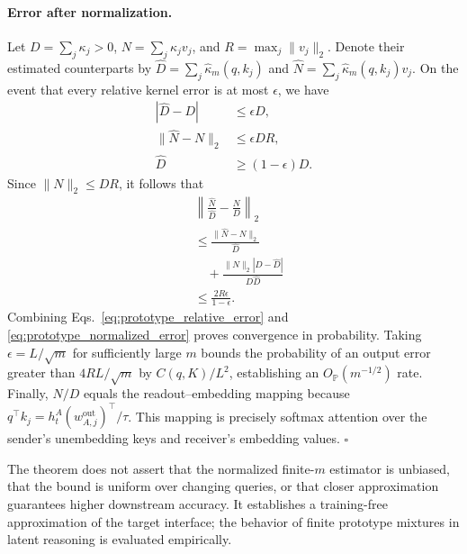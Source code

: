 \documentclass[11pt]{article}
\begin{document}
\paragraph{Error after normalization.}
Let $D=\sum_j\kappa_j>0$, $N=\sum_j\kappa_jv_j$, and $R=\max_j\|v_j\|_2$. Denote their estimated counterparts by $\widehat D=\sum_j\widehat{\kappa}_m(q,k_j)$ and $\widehat N=\sum_j\widehat{\kappa}_m(q,k_j)v_j$. On the event that every relative kernel error is at most $\epsilon$, we have
\[
\begin{aligned}
    |\widehat D-D|&\leq\epsilon D, \\
    \|\widehat N-N\|_2&\leq\epsilon D R, \\
    \widehat D&\geq(1-\epsilon)D.
\end{aligned}
\]
Since $\|N\|_2\leq DR$, it follows that
\begin{equation}
\begin{aligned}
    &\left\|\frac{\widehat N}{\widehat D}
             -\frac{N}{D}\right\|_2 \\
    &\leq\frac{\|\widehat N-N\|_2}{\widehat D} \\
    &\quad+\frac{\|N\|_2|D-\widehat D|}{D\widehat D} \\
    &\leq\frac{2R\epsilon}{1-\epsilon}.
\end{aligned}
\label{eq:prototype_normalized_error}
\end{equation}
Combining Eqs.~\ref{eq:prototype_relative_error} and \ref{eq:prototype_normalized_error} proves convergence in probability. Taking $\epsilon=L/\sqrt{m}$ for sufficiently large $m$ bounds the probability of an output error greater than $4RL/\sqrt{m}$ by $C(q,K)/L^2$, establishing an $O_{\mathbb{P}}(m^{-1/2})$ rate. Finally, $N/D$ equals the readout--embedding mapping because $q^\top k_j=h_t^A(w_{A,j}^{\mathrm{out}})^\top/\tau$. This mapping is precisely softmax attention over the sender's unembedding keys and receiver's embedding values. \hfill$\square$

The theorem does not assert that the normalized finite-$m$ estimator is unbiased, that the bound is uniform over changing queries, or that closer approximation guarantees higher downstream accuracy. It establishes a training-free approximation of the target interface; the behavior of finite prototype mixtures in latent reasoning is evaluated empirically.


\providecommand{\smallerr}[1]{}
\renewcommand{\smallerr}[1]{{\scriptsize$\pm#1$}}
\end{document}
